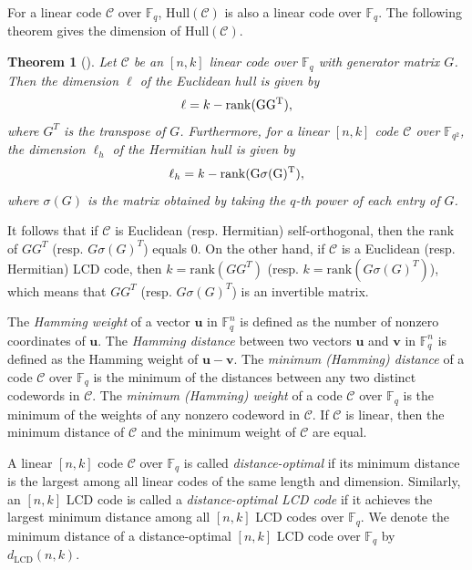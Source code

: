 \documentclass{article}
\newtheorem{theorem}{Theorem}[section]
\theoremstyle{definition}
\theoremstyle{remark}
\begin{document}
For a linear code $\mathcal{C}$ over $\mathbb{F}_q$, $\text{Hull}(\mathcal{C})$ is also a linear code over $\mathbb{F}_q$. The following theorem gives the dimension of $\text{Hull}(\mathcal{C})$.

\begin{theorem}[\cite{Li-hull-dim}] \label{hull-formula}
    Let $\mathcal{C}$ be an $[n, k]$ linear code over $\mathbb{F}_q$ with generator matrix $G$. Then the dimension $\ell$ of the Euclidean hull is given by
    \[
    \ell=k-\rm{rank}(GG^T),
    \]
    where $G^T$ is the transpose of $G$. Furthermore, for a linear $[n, k]$ code $\mathcal{C}$ over $\mathbb{F}_{q^2}$, the dimension $\ell_h$ of the Hermitian hull is given by
    \[
    \ell_h=k-\rm{rank}(G\sigma(G)^T),
    \]
    where $\sigma(G)$ is the matrix obtained by taking the $q$-th power of each entry of $G$.
\end{theorem}
It follows that if $\mathcal{C}$ is Euclidean (resp. Hermitian) self-orthogonal, then the rank of $GG^T$ (resp. $G\sigma(G)^T$) equals $0$. On the other hand, if $\mathcal{C}$ is a Euclidean (resp. Hermitian) LCD code, then $k=\text{rank}(GG^T)$ (resp. $k=\text{rank}(G\sigma(G)^T)$), which means that $GG^T$ (resp. $G\sigma(G)^T$) is an invertible matrix.

The \textit{Hamming weight} of a vector $\mathbf{u}$ in $\mathbb{F}_q^n$ is defined as the number of nonzero coordinates of $\mathbf{u}$. The \textit{Hamming distance} between two vectors $\mathbf{u}$ and $\mathbf{v}$ in $\mathbb{F}_q^n$ is defined as the Hamming weight of $\mathbf{u}-\mathbf{v}$. The \textit{minimum (Hamming) distance} of a code $\mathcal{C}$ over $\mathbb{F}_q$ is the minimum of the distances between any two distinct codewords in $\mathcal{C}$. The \textit{minimum (Hamming) weight} of a code $\mathcal{C}$ over $\mathbb{F}_q$ is the minimum of the weights of any nonzero codeword in $\mathcal{C}$. If $\mathcal{C}$ is linear, then the minimum distance of $\mathcal{C}$ and the minimum weight of $\mathcal{C}$ are equal.

A linear $[n, k]$ code $\mathcal{C}$ over $\mathbb{F}_q$ is called \textit{distance-optimal} if its minimum distance is the largest among all linear codes of the same length and dimension. Similarly, an $[n, k]$ LCD code is called a \textit{distance-optimal LCD code} if it achieves the largest minimum distance among all $[n, k]$ LCD codes over $\mathbb{F}_q$. We denote the minimum distance of a distance-optimal $[n, k]$ LCD code over $\mathbb{F}_q$ by $d_{\text{LCD}}(n, k)$.
\end{document}
